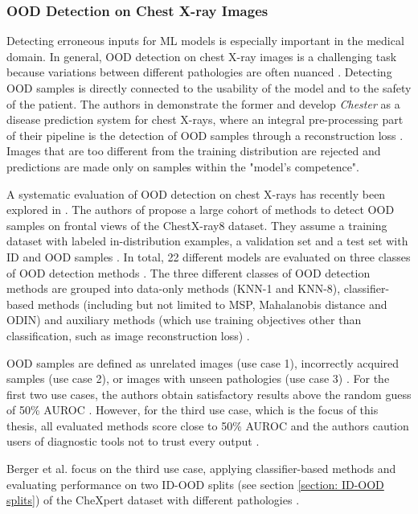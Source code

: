 \subsubsection{OOD Detection on Chest X-ray Images}
\label{section: OOD detection on Chest X-ray Images}
Detecting erroneous inputs for ML models is especially important in the medical domain.
In general, OOD detection on chest X-ray images is a challenging task because variations between different pathologies are often nuanced \citep{Salehi2022}.
Detecting OOD samples is directly connected to the usability of the model and to the safety of the patient.
The authors in \citep{Cohen2019} demonstrate the former and develop \textit{Chester} as a disease prediction system for chest X-rays, where an integral pre-processing part of their pipeline is the detection of OOD samples through a reconstruction loss \citep{Dumoulin2017}. 
Images that are too different from the training distribution are rejected \citep{Cohen2019} and predictions are made only on samples within the "model's competence".
\par
A systematic evaluation of OOD detection on chest X-rays has recently been explored in \citep{Cao2020}.
The authors of \citep{Cao2020} propose a large cohort of methods to detect OOD samples on frontal views of the ChestX-ray8 \citep{Wang2017} dataset.
They assume a training dataset with labeled in-distribution examples, a validation set and a test set with ID and OOD samples \citep{Cao2020}.
In total, 22 different models are evaluated on three classes of OOD detection methods \citep{Cao2020}.
The three different classes of OOD detection methods are grouped into data-only methods (KNN-1 and KNN-8), classifier-based methods (including but not limited to MSP, Mahalanobis distance and ODIN) and auxiliary methods (which use training objectives other than classification, such as image reconstruction loss) \citep{Cao2020}.
\par
OOD samples are defined as unrelated images (use case 1), incorrectly acquired samples (use case 2), or images with unseen pathologies (use case 3) \citep{Cao2020}.
For the first two use cases, the authors obtain satisfactory results above the random guess of 50\% AUROC \citep{Cao2020}.
However, for the third use case, which is the focus of this thesis, all evaluated methods score close to 50\% AUROC and the authors caution users of diagnostic tools not to trust every output \citep{Cao2020}.
\par
Berger et al. \citep{Berger2021} focus on the third use case, applying classifier-based methods and evaluating performance on two ID-OOD splits (see section \ref{section: ID-OOD splits}) of the CheXpert dataset \citep{Irvin2019} with different pathologies \citep{Berger2021}.
